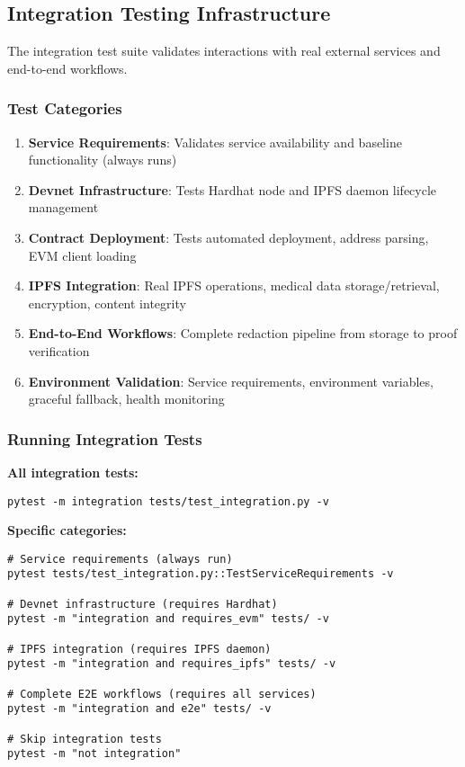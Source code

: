\subsection{Integration Testing Infrastructure}

The integration test suite validates interactions with real external services and end-to-end workflows.

\subsubsection{Test Categories}

\begin{enumerate}
    \item \textbf{Service Requirements}: Validates service availability and baseline functionality (always runs)
    \item \textbf{Devnet Infrastructure}: Tests Hardhat node and IPFS daemon lifecycle management
    \item \textbf{Contract Deployment}: Tests automated deployment, address parsing, EVM client loading
    \item \textbf{IPFS Integration}: Real IPFS operations, medical data storage/retrieval, encryption, content integrity
    \item \textbf{End-to-End Workflows}: Complete redaction pipeline from storage to proof verification
    \item \textbf{Environment Validation}: Service requirements, environment variables, graceful fallback, health monitoring
\end{enumerate}

\subsubsection{Running Integration Tests}

\textbf{All integration tests:}
\begin{verbatim}
pytest -m integration tests/test_integration.py -v
\end{verbatim}

\textbf{Specific categories:}
\begin{verbatim}
# Service requirements (always run)
pytest tests/test_integration.py::TestServiceRequirements -v

# Devnet infrastructure (requires Hardhat)
pytest -m "integration and requires_evm" tests/ -v

# IPFS integration (requires IPFS daemon)
pytest -m "integration and requires_ipfs" tests/ -v

# Complete E2E workflows (requires all services)
pytest -m "integration and e2e" tests/ -v

# Skip integration tests
pytest -m "not integration"
\end{verbatim}

